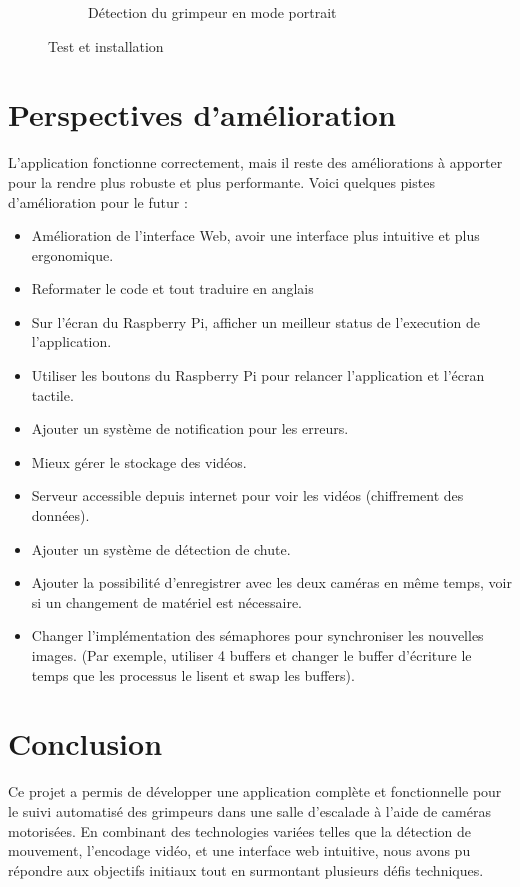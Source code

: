\documentclass[a4paper, 11pt, french]{article}
\newcounter{obj}
\begin{document}
\begin{figure}[!ht]
\begin{center}
\begin{subfigure}[b]{0.45\textwidth}
            \caption{Détection du grimpeur en mode portrait}
            \label{fig:test4}
        \end{subfigure}
        \caption{Test et installation}
        \label{fig:testDetection}
     \end{center}
\end{figure}

\section{Perspectives d'amélioration}
L'application fonctionne correctement, mais il reste des améliorations à apporter pour la rendre plus robuste et plus performante. Voici quelques pistes d'amélioration pour le futur :
\begin{itemize}
  \item Amélioration de l'interface Web, avoir une interface plus intuitive et plus ergonomique.
  \item Reformater le code et tout traduire en anglais
  \item Sur l'écran du Raspberry Pi, afficher un meilleur status de l'execution de l'application.
  \item Utiliser les boutons du Raspberry Pi pour relancer l'application et l'écran tactile. 
  \item Ajouter un système de notification pour les erreurs.
  \item Mieux gérer le stockage des vidéos.
  \item Serveur accessible depuis internet pour voir les vidéos (chiffrement des données).
  \item Ajouter un système de détection de chute.
  \item Ajouter la possibilité d'enregistrer avec les deux caméras en même temps, voir si un changement de matériel est nécessaire.
  \item Changer l'implémentation des sémaphores pour synchroniser les nouvelles images. (Par exemple, utiliser 4 buffers et changer le buffer d'écriture le temps que les processus le lisent et swap les buffers). 
\end{itemize}




\section{Conclusion}
Ce projet a permis de développer une application complète et fonctionnelle pour le suivi automatisé des grimpeurs dans une salle d'escalade à l'aide de caméras motorisées. En combinant des technologies variées telles que la détection de mouvement, l'encodage vidéo, et une interface web intuitive, nous avons pu répondre aux objectifs initiaux tout en surmontant plusieurs défis techniques.
\end{document}
